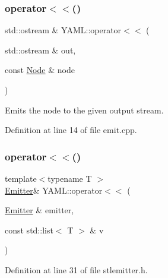 \subsubsection{\texorpdfstring{operator$<$$<$()}{operator<<()}\hspace{0.1cm}{\footnotesize\ttfamily [4/35]}}
{\footnotesize\ttfamily std\+::ostream \& Y\+A\+M\+L\+::operator$<$$<$ (\begin{DoxyParamCaption}\item[{std\+::ostream \&}]{out,  }\item[{const \mbox{\hyperlink{class_y_a_m_l_1_1_node}{Node}} \&}]{node }\end{DoxyParamCaption})}

Emits the node to the given output stream. 

Definition at line 14 of file emit.\+cpp.

\mbox{\label{namespace_y_a_m_l_ae0a4d3270d7ded1e06da6e249b8eceb0}} 
\subsubsection{\texorpdfstring{operator$<$$<$()}{operator<<()}\hspace{0.1cm}{\footnotesize\ttfamily [5/35]}}
{\footnotesize\ttfamily template$<$typename T $>$ \\
\mbox{\hyperlink{class_y_a_m_l_1_1_emitter}{Emitter}}\& Y\+A\+M\+L\+::operator$<$$<$ (\begin{DoxyParamCaption}\item[{\mbox{\hyperlink{class_y_a_m_l_1_1_emitter}{Emitter}} \&}]{emitter,  }\item[{const std\+::list$<$ T $>$ \&}]{v }\end{DoxyParamCaption})\hspace{0.3cm}{\ttfamily [inline]}}



Definition at line 31 of file stlemitter.\+h.

\mbox{\label{namespace_y_a_m_l_ac73a08b5b96a7d5ae9e1ccad98f39fe1}} 
